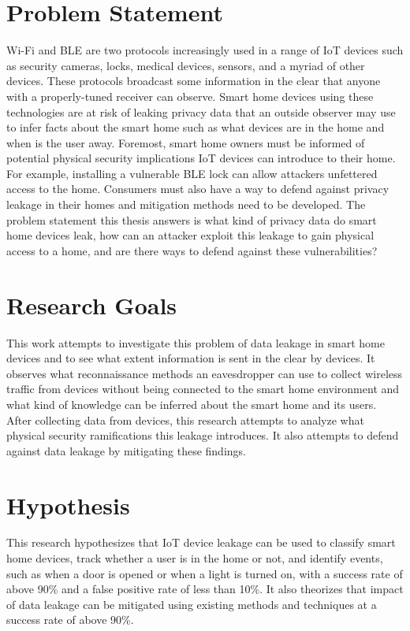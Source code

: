 \documentclass[12pt,letterpaper,oneside]{book}
\begin{document}
		\section{Problem Statement}
		Wi-Fi and \ac{BLE} are two protocols increasingly used in a range of \ac{IoT} devices such as security cameras, locks, medical devices, sensors, and a myriad of other devices. These protocols broadcast some information in the clear that anyone with a properly-tuned receiver can observe. Smart home devices using these technologies are at risk of leaking privacy data that an outside observer may use to infer facts about the smart home such as what devices are in the home and when is the user away. Foremost, smart home owners must be informed of potential physical security implications \ac{IoT} devices can introduce to their home. For example, installing a vulnerable \ac{BLE} lock can allow attackers unfettered access to the home. Consumers must also have a way to defend against privacy leakage in their homes and mitigation methods need to be developed. The problem statement this thesis answers is what kind of privacy data do smart home devices leak, how can an attacker exploit this leakage to gain physical access to a home, and are there ways to defend against these vulnerabilities?
		
		\section{Research Goals}
		This work attempts to investigate this problem of data leakage in smart home devices and to see what extent information is sent in the clear by devices. It observes what reconnaissance methods an eavesdropper can use to collect wireless traffic from devices without being connected to the smart home environment and what kind of knowledge can be inferred about the smart home and its users. After collecting data from devices, this research attempts to analyze what physical security ramifications this leakage introduces. It also attempts to defend against data leakage by mitigating these findings.
		
		\section{Hypothesis}
		This research hypothesizes that \ac{IoT} device leakage can be used to classify smart home devices, track whether a user is in the home or not, and identify events, such as when a door is opened or when a light is turned on, with a success rate of above 90\% and a false positive rate of less than 10\%. It also theorizes that impact of data leakage can be mitigated using existing methods and techniques at a success rate of above 90\%.
		
\end{document}
